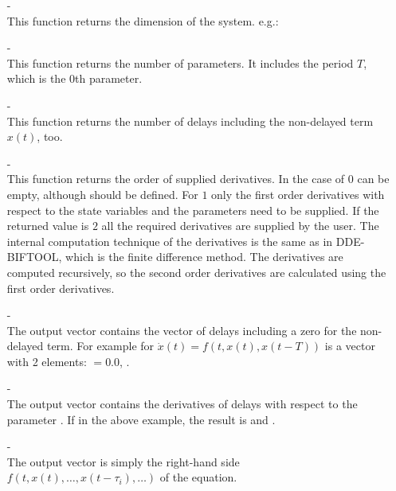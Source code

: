 \documentclass[10pt,a4paper]{ddedoc}
\begin{document}
\begin{itemize}
  \item[-]  \\ 
  This function returns the dimension of the
  system. e.g.: 
  
  \item[-]  \\ 
  This function returns the number of parameters. It
  includes the period $T$, which is the 0th parameter.
  
  \item[-]  \\ 
  This function returns the number of delays including the non-delayed term $x (
t )$, too.
  
  \item[-]  \\ 
  This function returns the order of supplied derivatives. In the case of $0$
 can be empty, although should be defined. For $1$ only the
first order derivatives with respect to the state variables and the parameters
need to be supplied. If the returned value is $2$ all the required derivatives
are supplied by the user. The internal computation technique of the derivatives
is the same as in DDE-BIFTOOL, which is the finite difference method. The
derivatives are computed recursively, so the second order derivatives are
calculated using the first order derivatives.
  
  \item[-] 
\\
  The output vector  contains the vector of delays
  including a zero for the non-delayed term. For example for $\dot{x} ( t ) =
  f ( t, x ( t ), x ( t - T ) )$  is a vector with 2 elements:
  $=0.0$, .
  
  \item[-]  \\
  The output vector  contains the derivatives of delays with respect to the parameter
  . If  in the above example, the result is
   and .
  
  \item[-]  \\ 
  The output vector  is simply the right-hand side $f ( t, x ( t ), \ldots, x ( t - \tau_i ),
\ldots )$ of the equation.
  

\end{itemize}
\end{document}

